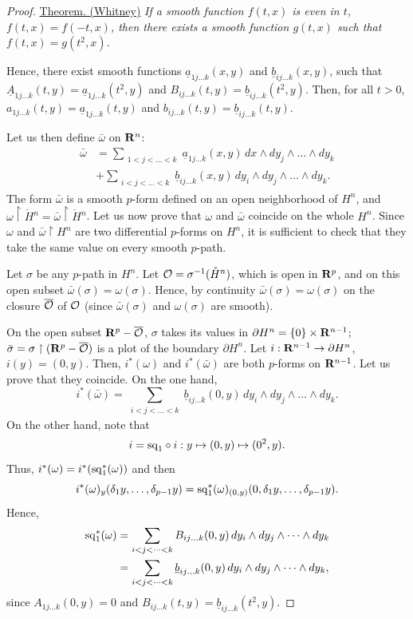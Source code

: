 \begin{proof}
  \uline{Theorem. (Whitney)} {\itshape If a smooth function $f(t,x)$ is even in $t$,
  $f(t,x) = f(-t,x)$,
  then there exists a smooth function $g(t,x)$ such that $f(t,x) = g(t^2,x)$.}
  
  Hence,
  there exist smooth functions $\underline{a}_{1j\dots k}(x,y)$ and $\underline{b}_{ij\dots k}(x,y)$,
  such that $\underline{A}_{1j\dots k}(t,y) = \underline{a}_{1j\dots k}(t^2,y)$ and $B_{ij\dots k}(t,y) = \underline{b}_{ij\dots k}(t^2,y)$.
  Then,
  for all $t > 0$,
  $a_{1j\dots k}(t,y) = \underline{a}_{1j\dots k}(t,y)$ and $b_{ij\dots k}(t,y) = \underline{b}_{ij\dots k}(t,y)$.
  
  Let us then define $\bar\omega$ on $\mathbf{R}^n$:
  \begin{align*}
    \bar\omega & = \sum_{\substack{1<j<\dots<k}} \underline{a}_{1j\dots k}(x,y) \, dx \wedge dy_j \wedge \dots \wedge dy_k \\
    & + \sum_{\substack{i<j<\dots<k}} \underline{b}_{ij\dots k}(x,y) \, dy_i \wedge dy_j \wedge \dots \wedge dy_k.
  \end{align*}
  The form $\bar\omega$ is a smooth $p$-form defined on an open neighborhood of $H^n$,
  and $\omega \restriction \mathring{H}{}^n = \bar\omega \restriction \mathring{H}{}^n$.
  Let us now prove that $\omega$ and $\bar\omega$ coincide on the whole $H^n$.
  Since $\omega$ and $\bar\omega \restriction H^n$ are two differential $p$-forms on $H^n$,
  it is sufficient to check that they take the same value on every smooth $p$-path.
  
  Let $\sigma$ be any $p$-path in $H^n$.
  Let $\mathcal{O} = \sigma^{-1}(\mathring{H}{}^n)$,
  which is open in $\mathbf{R}^p$,
  and on this open subset $\bar\omega(\sigma) = \omega(\sigma)$.
  Hence,
  by continuity $\bar\omega(\sigma) = \omega(\sigma)$ on the closure $\overline {\mathcal{O}}$ of $\mathcal{O}$
  (since $\bar\omega(\sigma)$ and $\omega(\sigma)$ are smooth).
  
  On the open subset $\mathbf{R}^p - \overline{\mathcal{O}}$,
  $\sigma$ takes its values in $\partial H^n = \{0\} \times \mathbf{R}^{n-1}$;
  $\bar\sigma = \sigma \restriction (\mathbf{R}^p - \overline{\mathcal{O}})$ is a plot of the boundary $\partial H^n$.
  Let $i: \mathbf{R}^{n-1} \to \partial H^n$,
  $i(y) = (0,y)$.
  Then,
  $i^*(\omega)$ and $i^*(\bar\omega)$ are both $p$-forms on $\mathbf{R}^{n-1}$.
  Let us prove that they coincide.
  On the one hand,
  $$
    i^*(\bar\omega) = \sum_{\substack{i<j<\dots<k}} \underline{b}_{ij\dots k}(0,y) \, dy_i \wedge dy_j \wedge \dots \wedge dy_k.
  $$
  On the other hand,
  note that
  $$
    i = {\operatorname{sq}}_1 \circ i : y \mapsto (0,y) \mapsto (0^2,y).
  $$
  Thus,
  $i^*(\omega) = i^*({\operatorname{sq}}_1^*(\omega))$ and then
  $$
    i^*(\omega)_y(\delta_1 y, \dots, \delta_{p-1} y) = {\operatorname{sq}}_1^*(\omega)_{(0,y)}(0, \delta_1 y, \dots, \delta_{p-1} y).
  $$
  Hence,
  \begin{align*}
    {\operatorname{sq}}_1^*(\omega) & = \sum_{\substack{i<j<\dots<k}} B_{ij\dots k}(0,y) \, dy_i \wedge dy_j \wedge \dots \wedge dy_k \\
    & = \sum_{\substack{i<j<\dots<k}} \underline{b}_{ij\dots k}(0,y) \, dy_i \wedge dy_j \wedge \dots \wedge dy_k,
  \end{align*}
  since $A_{1j\dots k}(0,y) = 0$ and $B_{ij\dots k}(t,y) = \underline{b}_{ij\dots k}(t^2,y)$.
  

\end{proof}
